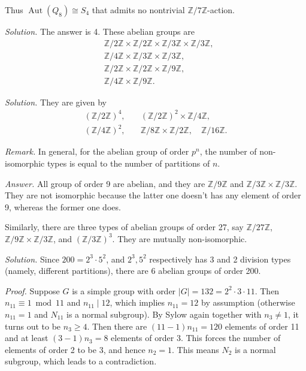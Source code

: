 \documentclass{mathproblems}
\newcommand\Z{\mathbb{Z}}
\DeclareMathOperator{\Aut}{Aut}
\begin{document}
\begin{questions}
\begin{itemize}
    Thus $\Aut(Q_8)\cong S_4$ that admits no nontrivial $\Z/7\Z$-action.
\end{itemize}



\textit{Solution.}
The answer is 4. These abelian groups are
$$
\begin{aligned}
&\Z/2\Z \times \Z/2\Z \times \Z/3\Z \times \Z/3\Z,\\ &\Z/4\Z \times \Z/3\Z \times \Z/3\Z, \\
&\Z/2\Z \times \Z/2\Z \times \Z/9\Z,\\
&\Z/4\Z \times \Z/9\Z.
\end{aligned}
$$


\textit{Solution.}
They are given by
$$
\begin{aligned}
(\Z/2\Z)^{4}, \quad &(\Z/2\Z)^{2}\times \Z/4\Z,\\
(\Z/4\Z)^{2}, \quad &\Z/8\Z \times \Z/2\Z, \quad \Z/16\Z.
\end{aligned}
$$

\textit{Remark.} In general, for the abelian group of order $p^n$, the number of non-isomorphic types is equal to the number of partitions of $n$. 



\textit{Answer.} All group of order 9 are abelian, and they are $\Z/9\Z$ and $\Z/3\Z\times \Z/3\Z$. They are not isomorphic because the latter one doesn't has any element of order 9, whereas the former one does.

Similarly, there are three types of abelian groups of order 27, say $\Z/27\Z$, $\Z/9\Z\times \Z/3\Z$, and $(\Z/3\Z)^{3}$. They are mutually non-isomorphic.


\textit{Solution.}
Since $200=2^3\cdot 5^2$, and $2^3,5^2$ respectively has 3 and 2 division types (namely, different partitions), there are 6 abelian groups of order 200.


\textit{Proof.} Suppose $G$ is a simple group with order $|G|=132=2^2 \cdot 3 \cdot 11$. Then $n_{11}\equiv 1\bmod 11$ and $n_{11}\mid 12$, which implies $n_{11}=12$ by assumption (otherwise $n_{11}=1$ and $N_{11}$ is a normal subgroup). By Sylow again together with $n_3\neq 1$, it turns out to be $n_3\geqslant 4$. Then there are $(11-1)n_{11}=120$ elements of order 11 and at least $(3-1)n_3=8$ elements of order 3. This forces the number of elements of order 2 to be 3, and hence $n_2=1$. This means $N_{2}$ is a normal subgroup, which leads to a contradiction.


\end{questions}
\end{document}
